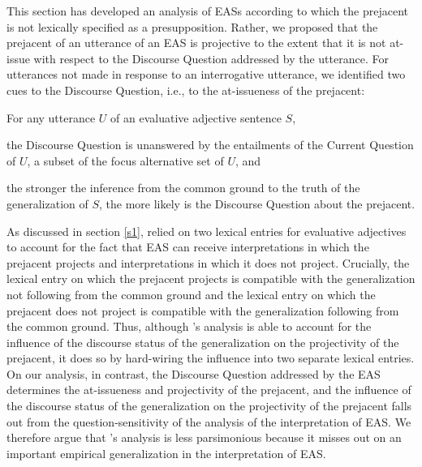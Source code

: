 \documentclass[11pt,fleqn]{article}
\newcommand{\6}{\mbox{$[\hspace*{-.6mm}[$}}
\newcommand{\9}{\mbox{$]\hspace*{-.6mm}]$}}
\newcommand{\citepos}[1]{\citeauthor{#1}'s \citeyear{#1}}
\begin{document}
This section has developed an analysis of EASs according to which the prejacent is not lexically specified as a presupposition. Rather, we proposed that the prejacent of an utterance of an EAS is projective to the extent that it is not at-issue with respect to the Discourse Question addressed by the utterance. For utterances not made in response to an interrogative utterance, we identified two cues to the Discourse Question, i.e., to the at-issueness of the prejacent:

\begin{exe}
\ex\label{cq-eval} For any utterance $U$ of an evaluative adjective sentence $S$,

\begin{xlist}

\ex the Discourse Question is unanswered by the entailments of the Current Question of $U$, a subset of the focus alternative set of $U$, and

\ex the stronger the inference from the common ground to the truth of the generalization of $S$, the more likely is the Discourse Question about the prejacent.

\end{xlist}

\end{exe}

As discussed in section \ref{s1}, \citet{karttunen-etal2014} relied on two lexical entries for evaluative adjectives to account for the fact that EAS can receive interpretations in which the prejacent projects and interpretations in which it does not project. Crucially, the lexical entry on which the prejacent projects is compatible with the generalization not following from the common ground and the lexical entry on which the prejacent does not project is compatible with the generalization following from the common ground. Thus, although \citepos{karttunen-etal2014} analysis is able to account for the influence of the discourse status of the generalization on the projectivity of the prejacent, it does so by hard-wiring the influence into two separate lexical entries. On our analysis, in contrast, the Discourse Question addressed by the EAS determines the at-issueness and projectivity of the prejacent, and the influence of the discourse status of the generalization on the projectivity of the prejacent falls out from the question-sensitivity of the analysis of the interpretation of EAS. We therefore argue that \citepos{karttunen-etal2014} analysis is less parsimonious because it misses out on an important empirical generalization in the interpretation of EAS. 
\end{document}
